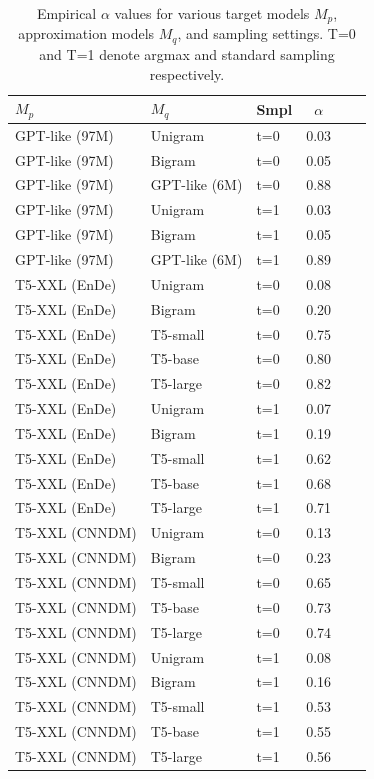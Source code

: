\documentclass[nohyperref]{article}
\theoremstyle{plain}
\theoremstyle{definition}
\theoremstyle{remark}
\begin{document}

\begin{table}[ht]
  \caption{Empirical $\alpha$ values for various target models $M_p$, approximation models $M_q$, and sampling settings. T=0 and T=1 denote argmax and standard sampling respectively\footnotemark[\value{footnote}].}
  \label{tbl:empirical alphas}
\vskip 0.15in
\begin{center}
\begin{small}
\begin{sc}
\begin{tabular}{lllccr}
\toprule
    $M_p$ & $M_q$ & Smpl & $\alpha$ \\
    
    \midrule
    GPT-like (97M) & Unigram      & t=0    & 0.03\\
    GPT-like (97M) & Bigram       & t=0    &  0.05\\
    GPT-like (97M) & GPT-like (6M)  & t=0    &  0.88\\
    GPT-like (97M) & Unigram      & t=1  &  0.03\\
    GPT-like (97M) & Bigram       & t=1  &  0.05\\
    GPT-like (97M) & GPT-like (6M)  & t=1  &  0.89\\
    \midrule
    \midrule
    
    T5-XXL (EnDe) & Unigram     & t=0 & 0.08 \\
    T5-XXL (EnDe) & Bigram      & t=0 & 0.20 \\
    T5-XXL (EnDe) & T5-small    & t=0 & 0.75\\
    T5-XXL (EnDe) & T5-base     & t=0 & 0.80\\
    T5-XXL (EnDe) & T5-large    & t=0 & 0.82\\
    T5-XXL (EnDe) & Unigram     & t=1 & 0.07 \\
    T5-XXL (EnDe) & Bigram      & t=1 & 0.19 \\
    T5-XXL (EnDe) & T5-small    & t=1 & 0.62\\
    T5-XXL (EnDe) & T5-base     & t=1 & 0.68\\
    T5-XXL (EnDe) & T5-large    & t=1 & 0.71 \\
    \midrule
    \midrule
    
    T5-XXL (CNNDM) & Unigram        & t=0 & 0.13 \\
    T5-XXL (CNNDM) & Bigram         & t=0 & 0.23 \\
    T5-XXL (CNNDM) & T5-small       & t=0 &  0.65\\
    T5-XXL (CNNDM) & T5-base        & t=0 &  0.73\\
    T5-XXL (CNNDM) & T5-large       & t=0 &  0.74\\
    T5-XXL (CNNDM) & Unigram        & t=1 & 0.08 \\
    T5-XXL (CNNDM) & Bigram         & t=1 & 0.16 \\
    T5-XXL (CNNDM) & T5-small      & t=1 & 0.53 \\
    T5-XXL (CNNDM) & T5-base       & t=1  & 0.55 \\
    T5-XXL (CNNDM) & T5-large      & t=1 & 0.56 \\
    \midrule
    \midrule
    

\end{tabular}
\end{sc}
\end{small}
\end{center}
\end{table}
\end{document}

